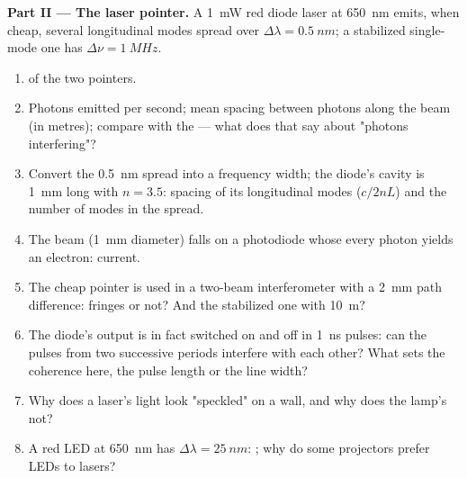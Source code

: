 \begin{problem}
\medskip
\noindent\textbf{Part II --- The laser pointer.}
A \qty{1}{mW} red diode laser at \qty{650}{nm} emits, when cheap, several
longitudinal modes spread over $\Delta\lambda = \qty{0.5}{nm}$; a stabilized
single-mode one has $\Delta\nu = \qty{1}{MHz}$.
\begin{enumerate}[resume]
  \item {} of the two pointers.
  \item Photons emitted per second; mean spacing between photons along
        the beam (in metres); compare with the  ---
        what does that say about "photons interfering"?
  \item Convert the \qty{0.5}{nm} spread into a frequency width; the
        diode's cavity is \qty{1}{mm} long with $n = 3.5$: spacing of its
        longitudinal modes ($c/2nL$) and the number of modes in the
        spread.
  \item The beam (\qty{1}{mm} diameter) falls on a photodiode whose
        every photon yields an electron: current.
  \item The cheap pointer is used in a two-beam interferometer with a
        \qty{2}{mm} path difference: fringes or not? And the stabilized one
        with \qty{10}{m}?
  \item The diode's output is in fact switched on and off in
        \qty{1}{ns} pulses: can the pulses from two successive periods
        interfere with each other? What sets the coherence here, the
        pulse length or the line width?
  \item Why does a laser's light look "speckled" on a wall, and why
        does the lamp's not?
  \item A red LED at \qty{650}{nm} has $\Delta\lambda = \qty{25}{nm}$: ; why do some projectors prefer LEDs to lasers?
\end{enumerate}


\end{problem}
